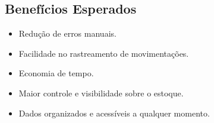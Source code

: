 \documentclass[
	12pt,				%
	openany,			%
	twoside,			%
	a4paper,			%
	english,			%
	brazil				%
	]{abntex2}
\begin{document}
\begin{apendicesenv}
\subsection*{Benefícios Esperados}

\begin{itemize}
    \item Redução de erros manuais.
    \item Facilidade no rastreamento de movimentações.
    \item Economia de tempo.
    \item Maior controle e visibilidade sobre o estoque.
    \item Dados organizados e acessíveis a qualquer momento.
\end{itemize}

\end{apendicesenv}




\postextual




%
%





\end{document}
